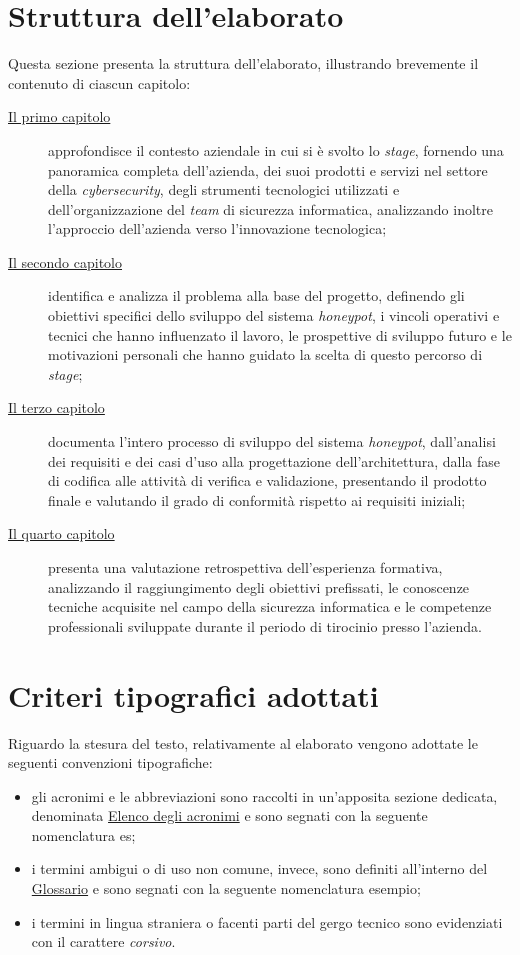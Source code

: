 \section*{Struttura dell'elaborato}
Questa sezione presenta la struttura dell'elaborato, illustrando brevemente il contenuto di ciascun capitolo:
\begin{description}
    \item[{\hyperref[chap:]{Il primo capitolo}}] approfondisce il contesto aziendale in cui si è svolto lo \textit{stage}, fornendo una panoramica completa dell'azienda, dei suoi prodotti e servizi nel settore della \textit{cybersecurity}, degli strumenti tecnologici utilizzati e dell'organizzazione del \textit{team} di sicurezza informatica, analizzando inoltre l'approccio dell'azienda verso l'innovazione tecnologica;

    \item[{\hyperref[chap:]{Il secondo capitolo}}] identifica e analizza il problema alla base del progetto, definendo gli obiettivi specifici dello sviluppo del sistema \textit{honeypot}, i vincoli operativi e tecnici che hanno influenzato il lavoro, le prospettive di sviluppo futuro e le motivazioni personali che hanno guidato la scelta di questo percorso di \textit{stage};

    \item[{\hyperref[chap:]{Il terzo capitolo}}] documenta l'intero processo di sviluppo del sistema \textit{honeypot}, dall'analisi dei requisiti e dei casi d'uso alla progettazione dell'architettura, dalla fase di codifica alle attività di verifica e validazione, presentando il prodotto finale e valutando il grado di conformità rispetto ai requisiti iniziali;
    
    \item[{\hyperref[chap:]{Il quarto capitolo}}] presenta una valutazione retrospettiva dell'esperienza formativa, analizzando il raggiungimento degli obiettivi prefissati, le conoscenze tecniche acquisite nel campo della sicurezza informatica e le competenze professionali sviluppate durante il periodo di tirocinio presso l'azienda.
\end{description}
\section*{Criteri tipografici adottati}
Riguardo la stesura del testo, relativamente al elaborato vengono adottate le seguenti convenzioni tipografiche:
\begin{itemize}
	\item gli acronimi e le abbreviazioni sono raccolti in un'apposita sezione dedicata, denominata \hyperref[acronimi]{Elenco degli acronimi} e sono segnati con la seguente nomenclatura \gls{es};
    \item i termini ambigui o di uso non comune, invece, sono definiti all'interno del \hyperref[glossario]{Glossario} e sono segnati con la seguente nomenclatura \gls{esempio};
	\item i termini in lingua straniera o facenti parti del gergo tecnico sono evidenziati con il carattere \textit{corsivo}.
\end{itemize}
\endgroup
\vfill
